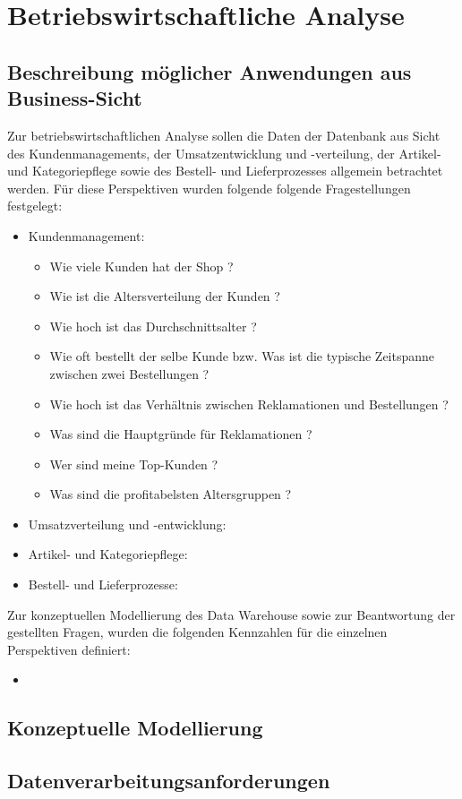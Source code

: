 \section{Betriebswirtschaftliche Analyse}
\subsection{Beschreibung möglicher Anwendungen aus Business-Sicht}
Zur betriebswirtschaftlichen Analyse sollen die Daten der Datenbank aus Sicht des Kundenmanagements, der Umsatzentwicklung und -verteilung, der Artikel- und Kategoriepflege sowie des Bestell- und Lieferprozesses allgemein betrachtet werden. Für diese Perspektiven wurden folgende folgende Fragestellungen festgelegt:  
\begin{itemize}
  \item Kundenmanagement:
  \begin{itemize}
    \item Wie viele Kunden hat der Shop ? 
    \item Wie ist die Altersverteilung der Kunden ?
    \item Wie hoch ist das Durchschnittsalter ?
    \item Wie oft bestellt der selbe Kunde bzw. Was ist die typische Zeitspanne zwischen zwei Bestellungen ?
    \item Wie hoch ist das Verhältnis zwischen Reklamationen und Bestellungen ?
    \item Was sind die Hauptgründe für Reklamationen ?
    \item Wer sind meine Top-Kunden ?
    \item Was sind die profitabelsten Altersgruppen ?  
  \end{itemize}
  \item Umsatzverteilung und -entwicklung:
  \item Artikel- und Kategoriepflege:
  \item Bestell- und Lieferprozesse:
\end{itemize}


Zur konzeptuellen Modellierung des Data Warehouse sowie zur Beantwortung der gestellten Fragen, wurden die folgenden Kennzahlen für die einzelnen Perspektiven definiert:
\begin{itemize}
  \item 
\end{itemize}

\subsection{Konzeptuelle Modellierung}
\subsection{Datenverarbeitungsanforderungen}
